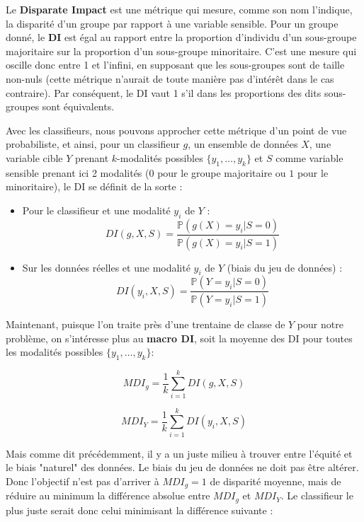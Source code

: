 Le \textbf{Disparate Impact} est une métrique qui mesure, comme son nom l’indique, la disparité d’un groupe par rapport à une variable sensible. Pour un groupe donné, le \textbf{DI} est égal au rapport entre la proportion d’individu d’un sous-groupe majoritaire sur la proportion d’un sous-groupe minoritaire. C’est une mesure qui oscille donc entre 1 et l'infini, en supposant que les sous-groupes sont de taille non-nuls (cette métrique n'aurait de toute manière pas d'intérêt dans le cas contraire). Par conséquent, le DI vaut 1 s’il dans les proportions des dits sous-groupes sont équivalents.
\newline

Avec les classifieurs, nous pouvons approcher cette métrique d’un point de vue probabiliste, et ainsi, pour un classifieur $g$, un ensemble de données $X$, une variable cible $Y$ prenant $k$-modalités possibles $\{y_1, \dots , y_k\}$ et $S$ comme variable sensible prenant ici 2 modalités ($0$ pour le groupe majoritaire ou $1$ pour le minoritaire), le DI se définit de la sorte :
\newline

\begin{itemize}
\item Pour le classifieur et une modalité $y_i$ de $Y$ :
$$DI(g, X, S) = \frac{\mathbb{P}(g(X) = y_i | S=0)}{\mathbb{P}(g(X) = y_i | S=1)}$$ 

\item Sur les données réelles et une modalité $y_i$ de $Y$ (biais du jeu de données) :
$$DI(y_i, X, S) = \frac{\mathbb{P}(Y = y_i | S=0)}{\mathbb{P}(Y = y_i | S=1)}$$
\end{itemize}

\hfill

Maintenant, puisque l'on traite près d'une trentaine de classe de $Y$ pour notre problème, on s'intéresse plus au \textbf{macro DI}, soit la moyenne des DI pour toutes les modalités possibles $\{y_1, \dots, y_k\} :$

$$
MDI_{g} = \frac{1}{k} \sum_{i=1}^{k} DI(g, X, S)
$$

$$
MDI_{Y} = \frac{1}{k} \sum_{i=1}^{k} DI(y_i, X, S)
$$

Mais comme dit précédemment, il y a un juste milieu à trouver entre l’équité et le biais "naturel" des données. Le biais du jeu de données ne doit pas être altérer. Donc l’objectif n’est pas d’arriver à $MDI_{g} = 1$ de disparité moyenne, mais de réduire au minimum la différence absolue entre $MDI_{g}$ et $MDI_{Y}$. Le classifieur le plus juste serait donc celui minimisant la différence suivante :

